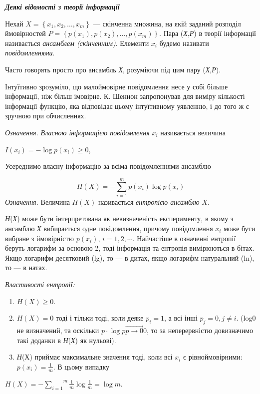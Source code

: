 {\centering\bfseries\itshape
Деякі відомості з теорії інформації
\par}

 Нехай  $X=\left\{ x_{1},x_{2},\dots,x_m \right\}$ ---
скінченна множина, на якій заданий розподіл ймовірностей 
$P=\left\{ p(x_{1}),p(x_{2}),\dots,p(x_m) \right\}$.
Пара (\textit{Х},\textit{Р}) в теорії інформації називається \textit{ансамблем
(скінченним)}. Елементи  $x_i$ будемо називати \textit{повідомленнями}.

 Часто говорять просто про ансамбль \textit{Х}, розуміючи під цим пару
(\textit{Х},\textit{Р}).

 Інтуїтивно зрозуміло, що малоймовірне повідомлення несе у собі  більше
інформації, ніж більш імовірне. К. Шеннон запропонував для виміру кількості
інформації функцію, яка відповідає цьому інтуїтивному уявленню, і до того ж  є
зручною при обчисленнях.

\textit{Означення.} \textit{ Власною інформацією повідомлення}  $x_i$
називається величина

{\centering
 $I(x_{i})=-\log p(x_i)\ge 0$,
\par}

 Усереднимо власну інформацію за всіма повідомленнями ансамблю

\begin{equation*}
{H(X)=-\overset{m}{\underset{i=1}{\sum }}{p(x_{i})\log p(x_{i})}}
\end{equation*}
\textit{Означення.} Величина  $H(X)$ називається \textit{ентропією ансамблю} 
$X$.

\textit{Н}(\textit{Х}) може бути інтерпретована як невизначеність експерименту,
в  якому  з ансамблю \textit{Х }вибирається одне повідомлення, причому
повідомлення   $x_i$ може бути вибране з ймовірністю $p(x_i)$,
$i=1,2,\dotsm\text{.}$ Найчастіше в означенні ентропії
беруть логарифм за основою 2, тоді інформація та ентропія вимірюються в бітах.
Якщо логарифм десятковий (lg), то --- в дитах, якщо логарифм натуральний (ln), то
--- в натах.


\bigskip

{\itshape
Властивості ентропії:}

\liststyleWWviiiNumxxxix
\begin{enumerate}
\item  $H(X)\ge 0$.
\item  $H(X)=0$ тоді і тільки тоді, коли деяке  $p_i=1$, а всі інші 
$p_j=0,j\neq i$. (log0 не визначений, та оскільки  ${p\cdot
\log p\overrightarrow{{p\rightarrow 0}}0}$, то за неперервністю
довизначимо такі доданки в \textit{Н}(\textit{Х}) як нульові).
\item \textit{Н}(Х) приймає максимальне значення тоді, коли всі  $x_i$ є
рівноймовірними:  $p(x_{i})=\frac{1}m$. В цьому випадку
\end{enumerate}
{\centering
 ${H(X)=-\overset{m}{\underset{i=1}{\sum
}}{\frac{1}{m}\log \frac{1}{m}}=\log m}$.
\par}


